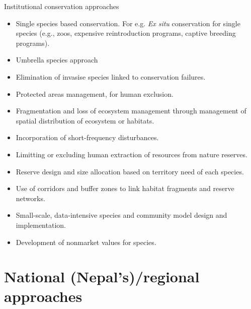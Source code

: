 \documentclass[ignorenonframetext,aspectratio=169]{beamer}
\providecommand{\tightlist}{%
  \setlength{\itemsep}{0pt}\setlength{\parskip}{0pt}}
\begin{document}
\begin{frame}{Institutional conservation approaches}
\protect\hypertarget{institutional-conservation-approaches}{}

\begin{itemize}
\tightlist
\item
  Single species based conservation. For e.g. \emph{Ex situ}
  conservation for single species (e.g., zoos, expensive reintroduction
  programs, captive breeding programs).
\item
  Umbrella species approach
\item
  Elimination of invasise species linked to conservation failures.
\item
  Protected areas management, for human exclusion.
\item
  Fragmentation and loss of ecosystem management through management of
  spatial distribution of ecosystem or habitats.
\item
  Incorporation of short-frequency disturbances.
\item
  Limitting or excluding human extraction of resources from nature
  reserves.
\item
  Reserve design and size allocation based on territory need of each
  species.
\item
  Use of corridors and buffer zones to link habitat fragments and
  reserve networks.
\item
  Small-scale, data-intensive species and community model design and
  implementation.
\item
  Development of nonmarket values for species.
\end{itemize}

\end{frame}

\hypertarget{national-nepalsregional-approaches}{%
\section{National (Nepal's)/regional
approaches}\label{national-nepalsregional-approaches}}
\end{document}
